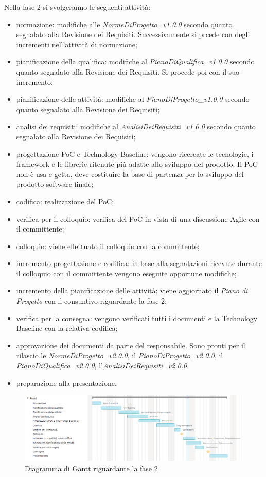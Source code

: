 Nella fase 2 si svolgeranno le seguenti attività:
\begin{itemize}
	\item normazione: modifiche alle \textit{NormeDiProgetto\_v1.0.0} secondo quanto segnalato alla Revisione dei Requisiti. Successivamente si prcede con degli incrementi nell'attività di normazione;
	\item pianificazione della qualifica: modifiche al \textit{PianoDiQualifica\_v1.0.0} secondo quanto segnalato alla Revisione dei Requisiti. Si procede poi con il suo incremento;
	\item pianificazione delle attività: modifiche al \textit{PianoDiProgetto\_v1.0.0} secondo quanto segnalato alla Revisione dei Requisiti;
	\item analisi dei requisiti: modifiche al \textit{AnalisiDeiRequisiti\_v1.0.0} secondo quanto segnalato alla Revisione dei Requisiti;
	\item progettazione PoC e Technology Baseline: vengono ricercate le tecnologie, i framework e le librerie ritenute più adatte allo sviluppo del prodotto. Il PoC non è usa e getta, deve costituire la base di partenza per lo sviluppo del prodotto software finale;
	\item codifica: realizzazione del PoC;
	\item verifica per il colloquio: verifica del PoC in vista di una discussione Agile con il committente;
	\item colloquio: viene effettuato il colloquio con la committente;
	\item incremento progettazione e codifica: in base alla segnalazioni ricevute durante il colloquio con il committente vengono eseguite opportune modifiche;
	\item incremento della pianificazione delle attività: viene aggiornato il \textit{Piano di Progetto} con il consuntivo riguardante la fase 2;
	\item verifica per la consegna: vengono verificati tutti i documenti e la Technology Baseline con la relativa codifica;
	\item approvazione dei documenti da parte del responsabile. Sono pronti per il rilascio le \textit{NormeDiProgetto\_v2.0.0}, il \textit{PianoDiProgetto\_v2.0.0}, il \textit{PianoDiQualifica\_v2.0.0}, l'\textit{AnalisiDeiRequisiti\_v2.0.0}.
	\item preparazione alla presentazione.
\end{itemize}

\begin{figure}[h]
	\centering
	\includegraphics[scale=0.67]{images/fase2.png}
	\caption{Diagramma di Gantt riguardante la fase 2}
\end{figure}